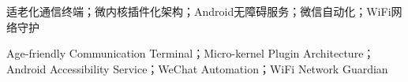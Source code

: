 \documentclass[12pt,AutoFakeBold]{xuptThesis}
\begin{document}
\begin{keywords}
适老化通信终端；微内核插件化架构；Android无障碍服务；微信自动化；WiFi网络守护
\end{keywords}

\begin{abstracten}

\end{abstracten}

\begin{keywordsen}
Age-friendly Communication Terminal；Micro-kernel Plugin Architecture；Android Accessibility Service；WeChat Automation；WiFi Network Guardian
\end{keywordsen}

\mytableofcontents

\clearpage
\setcounter{page}{1}
\pagestyle{fancy}





% 
\end{document}
